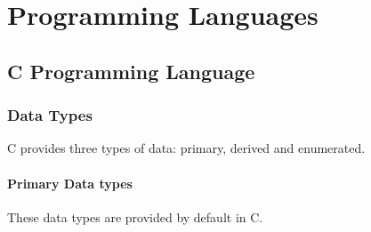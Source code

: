 \part{Programming Languages}
\chapter{C Programming Language}
\section{Data Types}
C provides three types of data: primary, derived and enumerated.
\subsection{Primary Data types} These data types are provided by default in C.